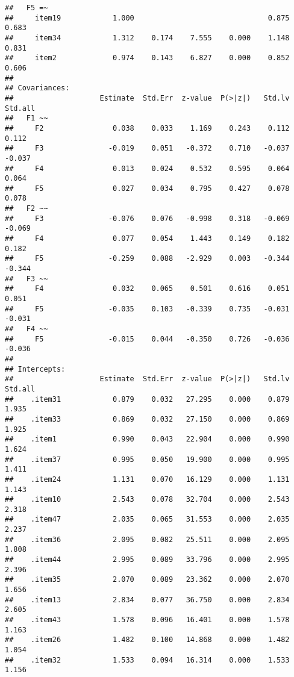 \documentclass[
  english,
  man]{apa6}
\begin{document}
\begin{verbatim}
##   F5 =~                                                                 
##     item19            1.000                               0.875    0.683
##     item34            1.312    0.174    7.555    0.000    1.148    0.831
##     item2             0.974    0.143    6.827    0.000    0.852    0.606
## 
## Covariances:
##                    Estimate  Std.Err  z-value  P(>|z|)   Std.lv  Std.all
##   F1 ~~                                                                 
##     F2                0.038    0.033    1.169    0.243    0.112    0.112
##     F3               -0.019    0.051   -0.372    0.710   -0.037   -0.037
##     F4                0.013    0.024    0.532    0.595    0.064    0.064
##     F5                0.027    0.034    0.795    0.427    0.078    0.078
##   F2 ~~                                                                 
##     F3               -0.076    0.076   -0.998    0.318   -0.069   -0.069
##     F4                0.077    0.054    1.443    0.149    0.182    0.182
##     F5               -0.259    0.088   -2.929    0.003   -0.344   -0.344
##   F3 ~~                                                                 
##     F4                0.032    0.065    0.501    0.616    0.051    0.051
##     F5               -0.035    0.103   -0.339    0.735   -0.031   -0.031
##   F4 ~~                                                                 
##     F5               -0.015    0.044   -0.350    0.726   -0.036   -0.036
## 
## Intercepts:
##                    Estimate  Std.Err  z-value  P(>|z|)   Std.lv  Std.all
##    .item31            0.879    0.032   27.295    0.000    0.879    1.935
##    .item33            0.869    0.032   27.150    0.000    0.869    1.925
##    .item1             0.990    0.043   22.904    0.000    0.990    1.624
##    .item37            0.995    0.050   19.900    0.000    0.995    1.411
##    .item24            1.131    0.070   16.129    0.000    1.131    1.143
##    .item10            2.543    0.078   32.704    0.000    2.543    2.318
##    .item47            2.035    0.065   31.553    0.000    2.035    2.237
##    .item36            2.095    0.082   25.511    0.000    2.095    1.808
##    .item44            2.995    0.089   33.796    0.000    2.995    2.396
##    .item35            2.070    0.089   23.362    0.000    2.070    1.656
##    .item13            2.834    0.077   36.750    0.000    2.834    2.605
##    .item43            1.578    0.096   16.401    0.000    1.578    1.163
##    .item26            1.482    0.100   14.868    0.000    1.482    1.054
##    .item32            1.533    0.094   16.314    0.000    1.533    1.156

\end{verbatim}
\end{document}
